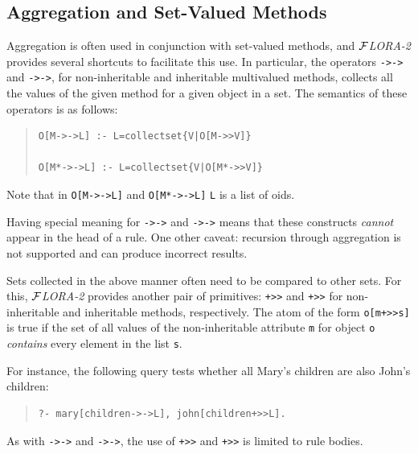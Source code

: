 \documentclass[11pt]{article}
\newcommand{\FLORA}{{\mbox{${\cal F}${\small\it LORA}\rm\emph{-2}}}\xspace}
\begin{document}
\subsection {Aggregation and Set-Valued Methods}

\index{{\tt ->->}}
\index{{\tt *->->}}
Aggregation is often used in conjunction with set-valued methods, and
\FLORA provides several shortcuts to facilitate this use.
In particular, the operators
{\tt ->->} and {\tt *->->}, for non-inheritable and
inheritable multivalued methods, collects all the values of the given
method for a given object in a set. The semantics of these operators is
as follows:

\begin{quote}
\begin{verbatim}
O[M->->L] :- L=collectset{V|O[M->>V]}

O[M*->->L] :- L=collectset{V|O[M*->>V]}
\end{verbatim}
\end{quote}

\noindent
Note that in {\tt O[M->->L]}  and {\tt O[M*->->L]}  {\tt L} is a list of oids.

Having special meaning for {\tt ->->} and {\tt *->->} means that these
constructs \emph{cannot} appear in the head of a rule.
One other caveat: recursion through aggregation is not supported and can
produce incorrect results.



\index{\tt +>>}
\index{\tt *+>>}
Sets collected in the above manner often  need to be compared to other
sets. For this, \FLORA provides another pair of primitives: {\tt +>>} and
{\tt *+>>} for non-inheritable and inheritable methods, respectively.
The atom of the form {\tt o[m+>>s]} is true if the set of all values of the
non-inheritable attribute {\tt m} for object {\tt o} \emph{contains} every
element in the list {\tt s}. 

For instance, the following query tests whether all Mary's children are
also John's children:
\begin{quote}
\begin{verbatim}
?- mary[children->->L], john[children+>>L].
\end{verbatim}
\end{quote}

As with {\tt ->->} and {\tt *->->},
the use of {\tt +>>} and {\tt *+>>} is limited to rule bodies.
\end{document}

